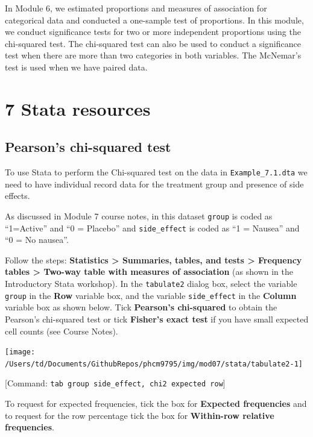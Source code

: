 \documentclass[
]{memoir}
\begin{document}
In Module 6, we estimated proportions and measures of association for categorical data and conducted a one-sample test of proportions. In this module, we conduct significance tests for two or more independent proportions using the chi-squared test. The chi-squared test can also be used to conduct a significance test when there are more than two categories in both variables. The McNemar's test is used when we have paired data.

\hypertarget{stata-resources}{%
\chapter*{\texorpdfstring{\textbf{7} Stata resources}{7 Stata resources}}\label{stata-resources}}

\hypertarget{pearsons-chi-squared-test}{%
\section{Pearson's chi-squared test}\label{pearsons-chi-squared-test}}

To use Stata to perform the Chi-squared test on the data in \texttt{Example\_7.1.dta} we need to have individual record data for the treatment group and presence of side effects.

As discussed in Module 7 course notes, in this dataset \texttt{group} is coded as ``1=Active'' and ``0 = Placebo'' and \texttt{side\_effect} is coded as ``1 = Nausea'' and ``0 = No nausea''.

Follow the steps: \textbf{Statistics \textgreater{} Summaries, tables, and tests \textgreater{} Frequency tables \textgreater{} Two-way table with measures of association} (as shown in the Introductory Stata workshop). In the \texttt{tabulate2} dialog box, select the variable \texttt{group} in the \textbf{Row} variable box, and the variable \texttt{side\_effect} in the \textbf{Column} variable box as shown below. Tick \textbf{Pearson's chi-squared} to obtain the Pearson's chi-squared test or tick \textbf{Fisher's exact test} if you have small expected cell counts (see Course Notes).

\texttt{[image: /Users/td/Documents/GithubRepos/phcm9795/img/mod07/stata/tabulate2-1]}

{[}Command: \texttt{tab\ group\ side\_effect,\ chi2\ expected\ row}{]}

To request for expected frequencies, tick the box for \textbf{Expected frequencies} and to request for the row percentage tick the box for \textbf{Within-row relative frequencies}.
\end{document}
